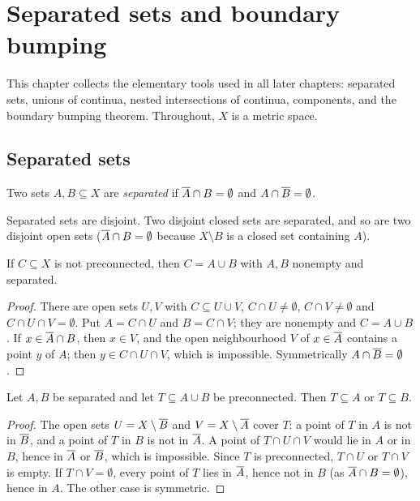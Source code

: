 \chapter{Separated sets and boundary bumping}\label{ch:bumping}

This chapter collects the elementary tools used in all later chapters: separated sets, unions
of continua, nested intersections of continua, components, and the boundary bumping theorem.
Throughout, $X$ is a metric space.

\section{Separated sets}

\begin{definition}\label{def:separated}
Two sets $A,B\subseteq X$ are \emph{separated} if $\overline{A}\cap B=\emptyset$ and $A\cap\overline{B}=\emptyset$.
\end{definition}

Separated sets are disjoint. Two disjoint closed sets are separated, and so are two disjoint open
sets ($\overline{A}\cap B=\emptyset$ because $X\setminus B$ is a closed set containing $A$).

\begin{lemma}\label{lem:sep-of-not-conn}
If $C\subseteq X$ is not preconnected, then $C=A\cup B$ with $A,B$ nonempty and separated.
\end{lemma}

\begin{proof}
There are open sets $U,V$ with $C\subseteq U\cup V$, $C\cap U\ne\emptyset$, $C\cap V\neq\emptyset$ and
$C\cap U\cap V=\emptyset$. Put $A=C\cap U$ and $B=C\cap V$; they are nonempty and $C=A\cup B$. If
$x\in\overline{A}\cap B$, then $x\in V$, and the open neighbourhood $V$ of $x\in\overline{A}$ contains a point $y$
of $A$; then $y\in C\cap U\cap V$, which is impossible. Symmetrically $A\cap\overline{B}=\emptyset$.
\end{proof}


\begin{lemma}\label{lem:side}
Let $A,B$ be separated and let $T\subseteq A\cup B$ be preconnected. Then $T\subseteq A$ or
$T\subseteq B$.
\end{lemma}

\begin{proof}
The open sets $U=X\setminus\overline{B}$ and $V=X\setminus\overline{A}$ cover $T$: a point of $T$ in $A$ is not in
$\overline{B}$, and a point of $T$ in $B$ is not in $\overline{A}$. A point of $T\cap U\cap V$ would lie in $A$ or
in $B$, hence in $\overline{A}$ or $\overline{B}$, which is impossible. Since $T$ is preconnected, $T\cap U$ or
$T\cap V$ is empty. If $T\cap V=\emptyset$, every point of $T$ lies in $\overline{A}$, hence not in $B$
(as $\overline{A}\cap B=\emptyset$), hence in $A$. The other case is symmetric.
\end{proof}

